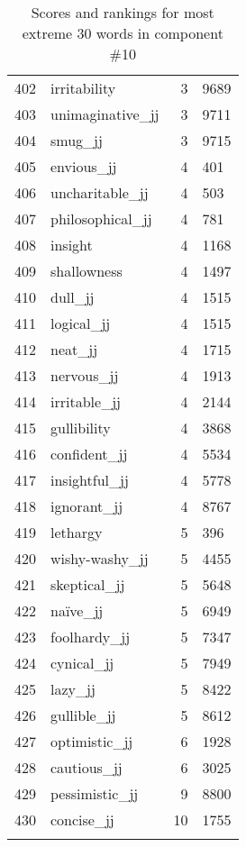 \begin{longtable}[!htbp]{| rlr@{.}l |}
    402 & irritability & 3 & 9689 \\
    403 & unimaginative\_jj & 3 & 9711 \\
    404 & smug\_jj & 3 & 9715 \\
    405 & envious\_jj & 4 & 401 \\
    406 & uncharitable\_jj & 4 & 503 \\
    407 & philosophical\_jj & 4 & 781 \\
    408 & insight & 4 & 1168 \\
    409 & shallowness & 4 & 1497 \\
    410 & dull\_jj & 4 & 1515 \\
    411 & logical\_jj & 4 & 1515 \\
    412 & neat\_jj & 4 & 1715 \\
    413 & nervous\_jj & 4 & 1913 \\
    414 & irritable\_jj & 4 & 2144 \\
    415 & gullibility & 4 & 3868 \\
    416 & confident\_jj & 4 & 5534 \\
    417 & insightful\_jj & 4 & 5778 \\
    418 & ignorant\_jj & 4 & 8767 \\
    419 & lethargy & 5 & 396 \\
    420 & wishy-washy\_jj & 5 & 4455 \\
    421 & skeptical\_jj & 5 & 5648 \\
    422 & naïve\_jj & 5 & 6949 \\
    423 & foolhardy\_jj & 5 & 7347 \\
    424 & cynical\_jj & 5 & 7949 \\
    425 & lazy\_jj & 5 & 8422 \\
    426 & gullible\_jj & 5 & 8612 \\
    427 & optimistic\_jj & 6 & 1928 \\
    428 & cautious\_jj & 6 & 3025 \\
    429 & pessimistic\_jj & 9 & 8800 \\
    430 & concise\_jj & 10 & 1755 \\
    \hline
    \caption{Scores and rankings for most extreme 30 words in component \#10} \\
\end{longtable}
